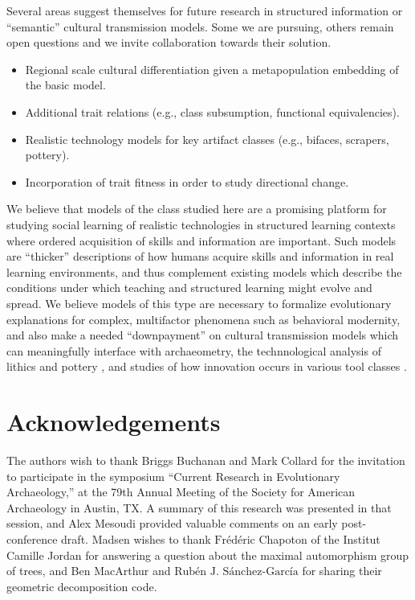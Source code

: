 \documentclass[referee,graybox,natbib]{svmult}
\begin{document}
Several areas suggest themselves for future research in structured
information or ``semantic'' cultural transmission models. Some we are
pursuing, others remain open questions and we invite collaboration
towards their solution.

\begin{itemize}
\itemsep1pt\parskip0pt
\item
  Regional scale cultural differentiation given a metapopulation
  embedding of the basic model.
\item
  Additional trait relations (e.g., class subsumption, functional
  equivalencies).
\item
  Realistic technology models for key artifact classes (e.g., bifaces,
  scrapers, pottery).
\item
  Incorporation of trait fitness in order to study directional change.
\end{itemize}

We believe that models of the class studied here are a promising
platform for studying social learning of realistic technologies in
structured learning contexts where ordered acquisition of skills and
information are important. Such models are ``thicker'' descriptions of
how humans acquire skills and information in real learning environments,
and thus complement existing models which describe the conditions under
which teaching and structured learning might evolve and spread. We
believe models of this type are necessary to formalize evolutionary
explanations for complex, multifactor phenomena such as behavioral
modernity, and also make a needed ``downpayment'' on cultural
transmission models which can meaningfully interface with archaeometry,
the technnological analysis of lithics and pottery
\citep{tostevin2012seeing}, and studies of how innovation occurs in
various tool classes \citep[e.g.,][]{o2010innovation}.

\section{Acknowledgements}\label{acknowledgements}

The authors wish to thank Briggs Buchanan and Mark Collard for the
invitation to participate in the symposium ``Current Research in
Evolutionary Archaeology,'' at the 79th Annual Meeting of the Society
for American Archaeology in Austin, TX. A summary of this research was
presented in that session, and Alex Mesoudi provided valuable comments
on an early post-conference draft. Madsen wishes to thank
$\textrm{Fr\'ed\'eric}$ Chapoton of the Institut Camille Jordan for
answering a question about the maximal automorphism group of trees, and
Ben MacArthur and $\textrm{Rub\'en J. S\'anchez-Garc\'ia}$ for sharing
their geometric decomposition code.
\end{document}

